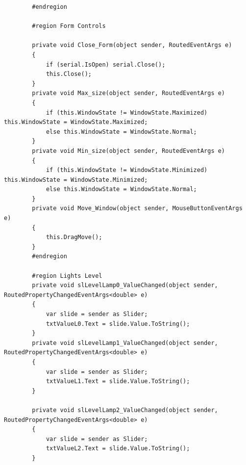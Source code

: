 \begin{lstlisting}
        #endregion

        #region Form Controls

        private void Close_Form(object sender, RoutedEventArgs e)
        {
            if (serial.IsOpen) serial.Close();
            this.Close();
        }
        private void Max_size(object sender, RoutedEventArgs e)
        {
            if (this.WindowState != WindowState.Maximized) this.WindowState = WindowState.Maximized;
            else this.WindowState = WindowState.Normal;
        }
        private void Min_size(object sender, RoutedEventArgs e)
        {
            if (this.WindowState != WindowState.Minimized) this.WindowState = WindowState.Minimized;
            else this.WindowState = WindowState.Normal;
        }
        private void Move_Window(object sender, MouseButtonEventArgs e)
        {
            this.DragMove();
        }
        #endregion

        #region Lights Level
        private void slLevelLamp0_ValueChanged(object sender, RoutedPropertyChangedEventArgs<double> e)
        {
            var slide = sender as Slider;
            txtValueL0.Text = slide.Value.ToString();
        }
        private void slLevelLamp1_ValueChanged(object sender, RoutedPropertyChangedEventArgs<double> e)
        {
            var slide = sender as Slider;
            txtValueL1.Text = slide.Value.ToString();
        }

        private void slLevelLamp2_ValueChanged(object sender, RoutedPropertyChangedEventArgs<double> e)
        {
            var slide = sender as Slider;
            txtValueL2.Text = slide.Value.ToString();
        }


\end{lstlisting}
